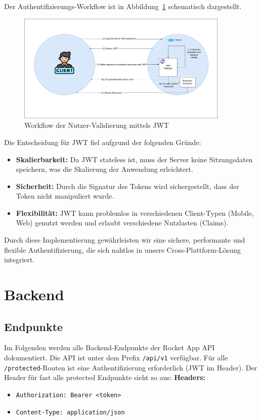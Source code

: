\documentclass[11pt,a4paper]{article}
\begin{document}
Der Authentifizierungs-Workflow ist in Abbildung~\ref{fig:validation-workflow} schematisch dargestellt.

\begin{figure}[H]
    \centering
    \includegraphics[width=0.9\textwidth]{images/ValidationWorkflow.png}
    \caption{Workflow der Nutzer-Validierung mittels JWT}
    \label{fig:validation-workflow}
\end{figure}

Die Entscheidung für JWT fiel aufgrund der folgenden Gründe:
\begin{itemize}
    \item \textbf{Skalierbarkeit:} Da JWT stateless ist, muss der Server keine Sitzungsdaten speichern, was die Skalierung der Anwendung erleichtert.
    \item \textbf{Sicherheit:} Durch die Signatur des Tokens wird sichergestellt, dass der Token nicht manipuliert wurde.
    \item \textbf{Flexibilität:} JWT kann problemlos in verschiedenen Client-Typen (Mobile, Web) genutzt werden und erlaubt verschiedene Nutzlasten (Claims).
\end{itemize}

Durch diese Implementierung gewährleisten wir eine sichere, performante und flexible Authentifizierung, die sich nahtlos in unsere Cross-Plattform-Lösung integriert.

\section{Backend}

\subsection{Endpunkte}

Im Folgenden werden alle Backend-Endpunkte der Rocket App API dokumentiert. Die API ist unter dem Prefix \texttt{/api/v1} verfügbar. Für alle \texttt{/protected}-Routen ist eine Authentifizierung erforderlich (JWT im Header).
Der Header für fast alle protected Endpunkte sieht so aus:
    \textbf{Headers:}
    \begin{itemize}
        \item \texttt{Authorization: Bearer <token>}
        \item \texttt{Content-Type: application/json}
    \end{itemize}
\end{document}

